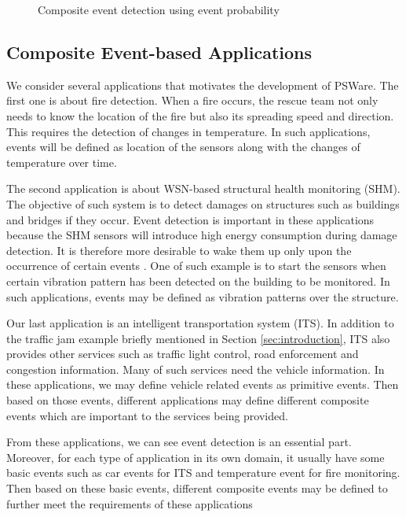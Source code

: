 \begin{figure}
\centering
{}
\caption{Composite event detection using event probability}
\label{fig:event-detection3}
\end{figure}

\subsection{Composite Event-based Applications}
We consider several applications that motivates the development of PSWare. The first one is about fire detection. When a fire occurs, the rescue team not only needs to know the location of the fire but also its spreading speed and direction. This requires the detection of changes in temperature. In such applications, events will be defined as location of the sensors along with the changes of temperature over time.

The second application is about WSN-based structural health monitoring (SHM). The objective of such system is to detect damages on structures such as buildings and bridges if they occur. Event detection is important in these applications because the SHM sensors will introduce high energy consumption during damage detection. It is therefore more desirable to wake them up only upon the occurrence of certain events \cite{jangshm}. One of such example is to start the sensors when certain vibration pattern has been detected on the building to be monitored. In such applications, events may be defined as vibration patterns over the structure.

Our last application is an intelligent transportation system (ITS). In addition to the traffic jam example briefly mentioned in Section \ref{sec:introduction}, ITS also provides other services such as traffic light control, road enforcement and congestion information. Many of such services need the vehicle information. In these applications, we may define vehicle related events as primitive events. Then based on those events, different applications may define different composite events which are important to the services being provided.

From these applications, we can see event detection is an essential part. Moreover, for each type of application in its own domain, it usually have some basic events such as car events for ITS and temperature event for fire monitoring. Then based on these basic events, different composite events may be defined to further meet the requirements of these applications

